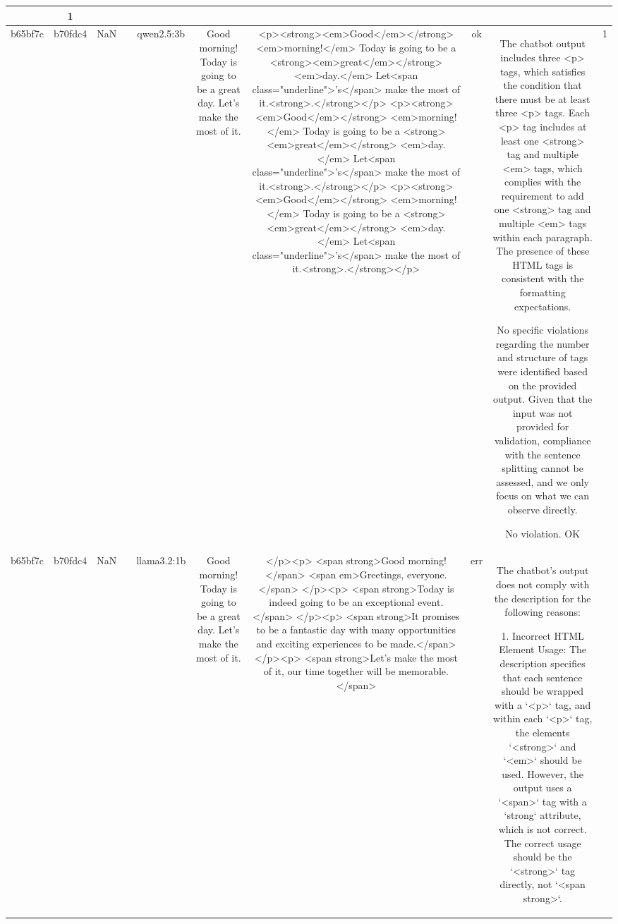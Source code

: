 \begin{table}[h!]
\begin{tabular}{|c|c|c|c|c|c|c|c|c|c|}
{{Given these observations, the output does not meet the requirement of having at least three `<p>` tags, thereby violating the chatbot's description.

ERR & 1\\
\hline
b65bf7c & b70fdc4 & NaN &  & qwen2.5:3b & Good morning! Today is going to be a great day. Let's make the most of it. & <p><strong><em>Good</em></strong> <em>morning!</em> Today is going to be a <strong><em>great</em></strong> <em>day.</em> Let<span class="underline">'s</span> make the most of it.<strong>.</strong></p>
<p><strong><em>Good</em></strong> <em>morning!</em> Today is going to be a <strong><em>great</em></strong> <em>day.</em> Let<span class="underline">'s</span> make the most of it.<strong>.</strong></p>
<p><strong><em>Good</em></strong> <em>morning!</em> Today is going to be a <strong><em>great</em></strong> <em>day.</em> Let<span class="underline">'s</span> make the most of it.<strong>.</strong></p> & ok & The chatbot output includes three <p> tags, which satisfies the condition that there must be at least three <p> tags. Each <p> tag includes at least one <strong> tag and multiple <em> tags, which complies with the requirement to add one <strong> tag and multiple <em> tags within each paragraph. The presence of these HTML tags is consistent with the formatting expectations.

No specific violations regarding the number and structure of tags were identified based on the provided output. Given that the input was not provided for validation, compliance with the sentence splitting cannot be assessed, and we only focus on what we can observe directly.

No violation.
OK & 1\\
\hline
b65bf7c & b70fdc4 & NaN &  & llama3.2:1b & Good morning! Today is going to be a great day. Let's make the most of it. & </p><p>
<span strong>Good morning!</span> <span em>Greetings, everyone.</span> 
</p><p>
<span strong>Today is indeed going to be an exceptional event.</span> 
</p><p>
<span strong>It promises to be a fantastic day with many opportunities and exciting experiences to be made.</span> 
</p><p>
<span strong>Let's make the most of it, our time together will be memorable.</span> & err & The chatbot's output does not comply with the description for the following reasons:

1. Incorrect HTML Element Usage: The description specifies that each sentence should be wrapped with a `<p>` tag, and within each `<p>` tag, the elements `<strong>` and `<em>` should be used. However, the output uses a `<span>` tag with a `strong` attribute, which is not correct. The correct usage should be the `<strong>` tag directly, not `<span strong>`.

}}
\end{tabular}
\end{table}
